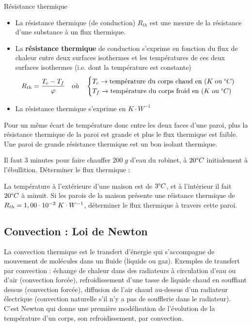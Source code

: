 \documentclass[11pt,a4paper]{article}
\begin{document}
\begin{defn}{Résistance thermique}
\begin{itemize}
    \item La résistance thermique (de conduction) $R_{th}$   est une mesure de la résistance d’une substance à un flux thermique. 
    \item La \textbf{résistance thermique} de conduction s'exprime en fonction du flux de chaleur entre deux surfaces isothermes et les températures de ces deux surfaces isothermes (i.e. dont la température est constante)
    \[ R_{th} = \dfrac{T_c - T_f}{\varphi}      
    \quad \text{où} \quad 
    \begin{cases}
    T_c \rightarrow \text{température du corps chaud en }(K \;\text{ou}\;\degree C) \\
    T_f \rightarrow \text{température du corps froid en }(K \;\text{ou}\;\degree C) \\
    \end{cases}
    \]
    \item La résistance thermique s’exprime en $K\cdot W^{-1}$
\end{itemize}
\end{defn}    

Pour un même écart de température donc entre les deux faces d’une paroi, plus la résistance thermique de la paroi est grande et plus le flux thermique est faible. Une paroi de grande résistance thermique est un bon isolant thermique.
\newpage
\begin{exo}
Il faut 3 minutes pour faire chauffer $200\; g $ d'eau du robinet, à $20\degree C$ initialement à l'ébullition. Déterminer le flux thermique : 
\vspace{5cm}
\end{exo}

\begin{exo}
La température à l'extérieure d'une maison est de $3\degree C$, et à l'intérieur il fait $20\degree C$ à minuit. Si les parois de la maison présente une réistance thermique de $R_{th} = 1,00\cdot10^{-2}\; K\cdot W^{-1}$, déterminer le flux thermique à travers cette paroi. 
\vspace{5cm}
\end{exo}	
	
\subsection{Convection : Loi de Newton}
La convection thermique est le  transfert d'énergie qui s'accompagne de mouvement de molécules dans un fluide (liquide ou gaz). Exemples de transfert par convection : échange de chaleur dans des radiateurs à circulation d'eau ou d'air (convection forcée), refroidissement d'une tasse de liquide chaud en soufflant dessus (convection forcée), diffusion de l'air chaud au-dessus d'un radiateur électrique (convection naturelle s'il n'y a pas de soufflerie dans le radiateur). C'est Newton qui donne une première modélisation de l'évolution de la température d'un corps, son refroidissement, par convection. 
\end{document}
